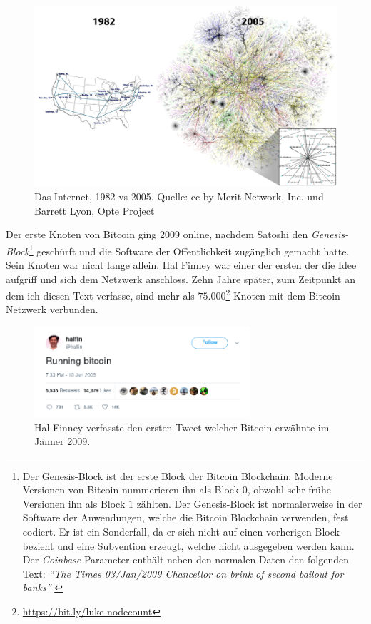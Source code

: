 \begin{figure}
  \includegraphics{assets/images/internet-evolution-white-dates.png}
  \caption{Das Internet, 1982 vs 2005. Quelle: cc-by Merit Network, Inc. und
  Barrett Lyon, Opte Project}
  \label{fig:internet-evolution-white-dates}
\end{figure}

Der erste Knoten von Bitcoin ging 2009 online, nachdem Satoshi den
\textit{Genesis-Block}\footnote{ Der Genesis-Block ist der erste Block der
Bitcoin Blockchain. Moderne Versionen von Bitcoin nummerieren ihn als Block $0$,
obwohl sehr frühe Versionen ihn als Block $1$ zählten. Der Genesis-Block ist
normalerweise in der Software der Anwendungen, welche die Bitcoin Blockchain
verwenden, fest codiert.  Er ist ein Sonderfall, da er sich nicht auf einen
vorherigen Block bezieht und eine Subvention erzeugt, welche nicht ausgegeben
werden kann. Der \textit{Coinbase}-Parameter enthält neben den normalen Daten
den folgenden Text: \textit{\enquote{The Times 03/Jan/2009 Chancellor on brink
of second bailout for banks}} \cite{btcwiki:genesis-block}} geschürft und die
Software der Öffentlichkeit zugänglich gemacht hatte. Sein Knoten war nicht
lange allein. Hal Finney war einer der ersten der die Idee aufgriff und
sich dem Netzwerk anschloss. Zehn Jahre später, zum Zeitpunkt an dem ich diesen
Text verfasse, sind mehr als
$75.000$\footnote{\url{https://bit.ly/luke-nodecount}} Knoten mit dem Bitcoin
Netzwerk verbunden.

\begin{figure}
  \centering
  \includegraphics[width=8cm]{assets/images/running-bitcoin.png}
  \caption{Hal Finney verfasste den ersten Tweet welcher Bitcoin erwähnte im
  Jänner 2009.}
  \label{fig:running-bitcoin}
\end{figure}

